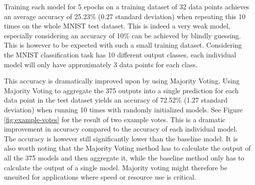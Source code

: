 Training each model for 5 epochs on a training dataset of 32 data points achieves an average accuracy of 25.23\% (0.27 standard deviation) when repeating this 10 times on the whole MNIST test dataset. This is indeed a very weak model, especially considering an accuracy of 10\% can be achieved by blindly guessing. This is however to be expected with such a small training dataset. Considering the MNIST classification task has 10 different output classes, each individual model will only have approximately 3 data points for each class.

This accuracy is dramatically improved upon by using Majority Voting. Using Majority Voting to aggregate the 375 outputs into a single prediction for each data point in the test dataset yields an accuracy of 72.52\% (1.27 standard deviation) when running 10 times with randomly initialized models. See Figure \ref{fig:example-votes} for the result of two example votes. This is a dramatic improvement in accuracy compared to the accuracy of each individual model. The accuracy is however still significantly lower than the baseline model. It is also worth noting that the Majority Voting method has to calculate the output of all the 375 models and then aggregate it, while the baseline method only has to calculate the output of a single model. Majority voting might therefore be unsuited for applications where speed or resource use is critical.

